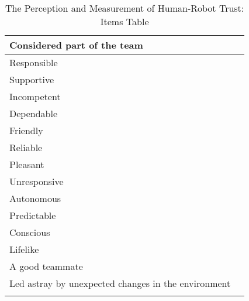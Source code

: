 \begin{longtable}{l|l}
	Considered part of the team & \\ \hline
	Responsible & \\ \hline
	Supportive & \\ \hline
	Incompetent & \\ \hline
	Dependable & \\ \hline
	Friendly & \\ \hline
	Reliable & \\ \hline
	Pleasant & \\ \hline
	Unresponsive & \\ \hline
	Autonomous & \\ \hline
	Predictable & \\ \hline
	Conscious & \\ \hline
	Lifelike & \\ \hline
	A good teammate & \\ \hline
	Led astray by unexpected changes in the environment & \\
	\caption{The Perception and Measurement of Human-Robot Trust: Items Table}
	\label{tbl:measurement.items.table}	
\end{longtable}

